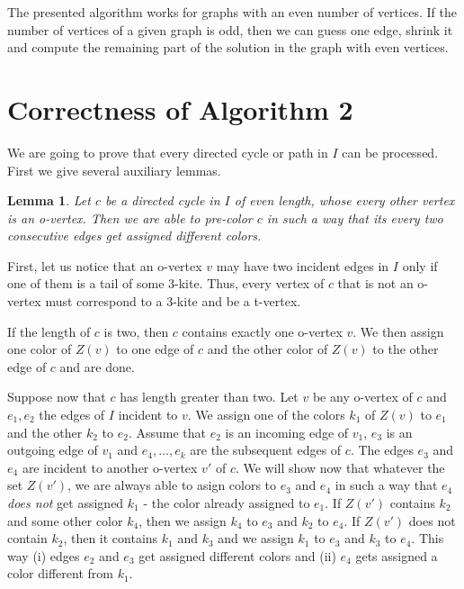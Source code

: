 \documentclass[a4, 11pt]{article}
\newcommand{\dowod}{\noindent{\bf Proof.~}}
\newcommand{\<}{\langle}
\renewcommand{\>}{\rangle}
\newtheorem{lemma}{Lemma}
\begin{document}
The presented algorithm works for graphs with an even number of vertices. If the number of vertices of a given graph is odd, then we can guess one edge, shrink it and compute the remaining part of the solution in the graph with even vertices. 

\section{Correctness of Algorithm 2} \label{AHcor}

We  are going to prove that every  directed cycle or path in $I$ can be processed.
First we give several auxiliary lemmas.


\begin{lemma}\label{preparz}
Let $c$ be a  directed cycle in $I$ of even length,   whose every other vertex is an o-vertex. Then we are able to pre-color  $c$ in such a way that its every two consecutive edges get assigned different colors.
\end{lemma}
\dowod

First, let us notice that  an o-vertex $v$ may have two incident edges in $I$ only if one of them is a tail of some $3$-kite. Thus, every vertex  of $c$ that is not an o-vertex must correspond to a $3$-kite and be a t-vertex.

If the length of $c$ is two, then $c$ contains exactly one o-vertex $v$. We then assign one  color of $Z(v)$ to one edge of $c$ and the other color of $Z(v)$ to the other edge of $c$ and are done. 

Suppose now that $c$ has length greater than two. Let $v$ be any o-vertex of $c$ and $e_1, e_2$ the edges of $I$ incident
to $v$. We assign one of the colors $k_1$ of $Z(v)$ to $e_1$ and the other $k_2$ to $e_2$. Assume that $e_2$ is an incoming edge of $v_1$, $e_3$ is an outgoing edge of $v_1$  and $e_4, \ldots, e_k$ are the subsequent edges of $c$. The edges $e_3$ and $e_4$ are incident
 to another o-vertex $v'$ of $c$. We will show now that whatever the set $Z(v')$, we are always able to asign colors to $e_3$ and $e_4$ in such a way that $e_4$ {\em does not} get assigned $k_1$ - the color already assigned to $e_1$. If $Z(v')$ contains $k_2$ and some other color $k_4$, then we assign $k_4$ to $e_3$ and $k_2$ to $e_4$. If $Z(v')$ does not contain $k_2$, then it contains $k_1$ and $k_3$ and we assign $k_1$ to $e_3$ and $k_3$ to $e_4$. This way (i)  edges $e_2$ and $e_3$  get assigned  different colors
and (ii) $e_4$ gets assigned a color different from $k_1$. 
\end{document}
